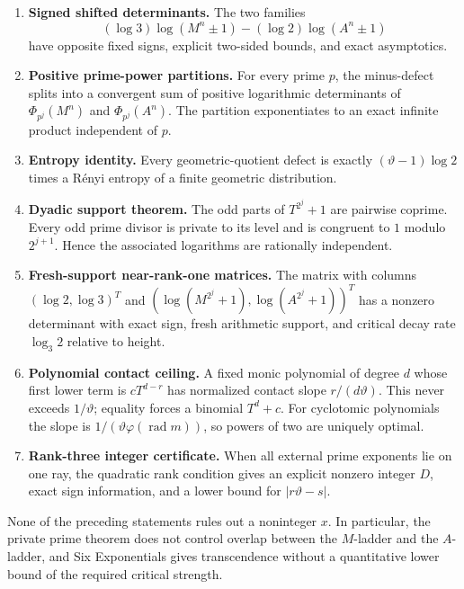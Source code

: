 \documentclass[11pt]{article}
\theoremstyle{definition}
\newcommand{\rad}{\operatorname{rad}}
\newcommand{\vphi}{\varphi}
\newcommand{\vtheta}{\vartheta}
\begin{document}
\begin{enumerate}
\item \textbf{Signed shifted determinants.}  The two families
\[
 (\log3)\log(M^n\pm1)-(\log2)\log(A^n\pm1)
\]
have opposite fixed signs, explicit two-sided bounds, and exact asymptotics.

\item \textbf{Positive prime-power partitions.}  For every prime $p$, the minus-defect
splits into a convergent sum of positive logarithmic determinants of
$\Phi_{p^j}(M^n)$ and $\Phi_{p^j}(A^n)$.  The partition exponentiates to an exact infinite
product independent of $p$.

\item \textbf{Entropy identity.}  Every geometric-quotient defect is exactly
$(\vtheta-1)\log2$ times a R\'enyi entropy of a finite geometric distribution.

\item \textbf{Dyadic support theorem.}  The odd parts of $T^{2^j}+1$ are pairwise
coprime.  Every odd prime divisor is private to its level and is congruent to $1$ modulo
$2^{j+1}$.  Hence the associated logarithms are rationally independent.

\item \textbf{Fresh-support near-rank-one matrices.}  The matrix with columns
$(\log2,\log3)^T$ and $(\log(M^{2^j}+1),\log(A^{2^j}+1))^T$ has a nonzero determinant
with exact sign, fresh arithmetic support, and critical decay rate $\log_3 2$ relative
to height.

\item \textbf{Polynomial contact ceiling.}  A fixed monic polynomial of degree $d$ whose
first lower term is $cT^{d-r}$ has normalized contact slope $r/(d\vtheta)$.  This never
exceeds $1/\vtheta$; equality forces a binomial $T^d+c$.  For cyclotomic polynomials the
slope is $1/(\vtheta\vphi(\rad m))$, so powers of two are uniquely optimal.

\item \textbf{Rank-three integer certificate.}  When all external prime exponents lie on
one ray, the quadratic rank condition gives an explicit nonzero integer $D$, exact sign
information, and a lower bound for $|r\vtheta-s|$.
\end{enumerate}

\begin{aewarningbox}
None of the preceding statements rules out a noninteger $x$.  In particular, the private
prime theorem does not control overlap between the $M$-ladder and the $A$-ladder, and Six
Exponentials gives transcendence without a quantitative lower bound of the required
critical strength.
\end{aewarningbox}
\end{document}
